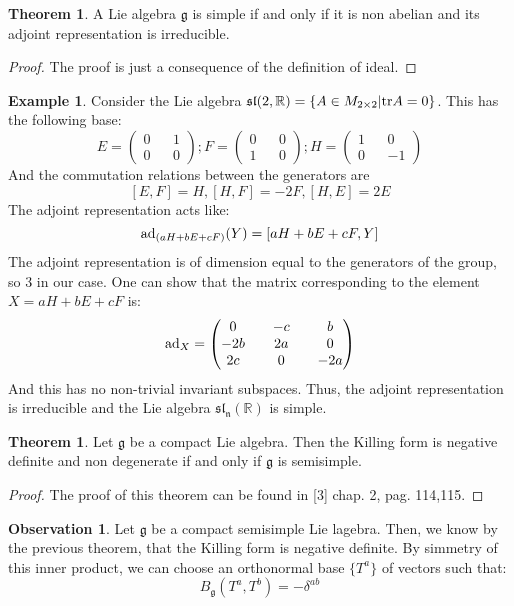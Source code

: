 \documentclass[12pt,a4paper]{report}
\theoremstyle{definition}
\theoremstyle{Theorem}
\newtheorem{Theo}[Def]{Theorem}
\theoremstyle{definition}
\newtheorem{Ex}[Def]{Example}
\theoremstyle{definition}
\newtheorem{Obs}[Def]{Observation}
\begin{document}
			\begin{Theo}
				A Lie algebra $\mathfrak{g}$ is simple if and only if it is non abelian and its adjoint representation is irreducible.
			\end{Theo}
			\begin{proof}
				The proof is just a consequence of the definition of ideal.			
			\end{proof}
			\begin{Ex}
					Consider the Lie algebra $\mathfrak{sl}(2,\mathbb{R})=\{A\in M_{2\times 2}|\hbox{tr} A=0\}$. This has the following base:
					$$E=
					\begin{pmatrix}
						0 && 1\\
						0 && 0
					\end{pmatrix};
					F=
					\begin{pmatrix}
						0 && 0\\
						1 && 0
					\end{pmatrix};
					H=
					\begin{pmatrix}
						1 && 0\\
						0 && -1
					\end{pmatrix}$$
					And the commutation relations between the generators are 
					$$[E,F]=H, [H,F]=-2F,[H,E]=2E$$
					The adjoint representation acts like:
					$$\hbox{ad}_{(aH+bE+cF)}(Y)=[aH+bE+cF,Y]$$
					The adjoint representation is of dimension equal to the generators of the group, so 3 in our case. One can show that the matrix corresponding to the element $X=aH+bE+cF$ is:
					$$\hbox{ad}_X=
					\begin{pmatrix}
						0 && -c && b \\
						-2b && 2a && 0 \\
						2c && 0 && -2a \\
					\end{pmatrix}$$
					And this has no non-trivial invariant subspaces. Thus, the adjoint representation is irreducible and the Lie algebra $\mathfrak{sl_n}(\mathbb{R})$ is simple.
			\end{Ex}
			\begin{Theo}
				Let $\mathfrak{g}$ be a compact Lie algebra. Then the Killing form is negative definite and non degenerate if and only if $\mathfrak{g}$ is semisimple.
			\end{Theo}
			\begin{proof}
				The proof of this theorem can be found in [3] chap. 2, pag. 114,115.
			\end{proof}
			\begin{Obs}
				Let $\mathfrak{g}$ be a compact semisimple Lie lagebra. Then, we know by the previous theorem, that the Killing form is negative definite. By simmetry of this inner product, we can choose an orthonormal base $\{T^a\}$ of vectors such that:
				$$B_{\mathfrak{g}}(T^a,T^b)=-\delta^{ab}$$
			\end{Obs}
\end{document}
